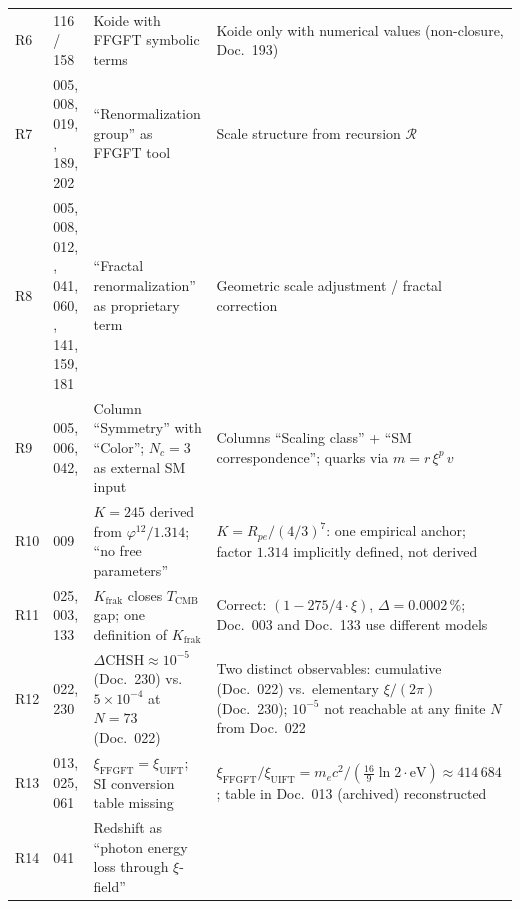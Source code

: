 {\begin{longtable}{p{0.6cm}p{2.4cm}p{5.5cm}p{5.5cm}}
R6 & 116 / 158 &
  Koide with FFGFT symbolic terms &
  Koide only with numerical values (non-closure, Doc.~193) \\[3pt]
R7 & 005, 008, 019, \newline 086, 189, 202 &
  \enquote{Renormalization group} as FFGFT tool &
  Scale structure from recursion $\mathcal{R}$ \\[3pt]
R8 & 005, 008, 012, \newline 014, 041, 060, \newline 133, 141, 159, 181 &
  \enquote{Fractal renormalization} as proprietary term &
  Geometric scale adjustment / fractal correction \\
R9 & 005, 006, 042, \newline 046 &
  Column \enquote{Symmetry} with \enquote{Color}; \newline
  $N_c = 3$ as external SM input &
  Columns \enquote{Scaling class} + \enquote{SM correspondence}; \newline
  quarks via $m = r\,\xi^p\,v$ \\[3pt]
R10 & 009 &
  $K = 245$ derived from $\varphi^{12}/1.314$; \newline
  \enquote{no free parameters} &
  $K = R_{pe}/(4/3)^7$: one empirical anchor; \newline
  factor $1.314$ implicitly defined, not derived \\[3pt]
R11 & 025, 003, 133 &
  $K_\text{frak}$ closes $T_\text{CMB}$ gap; \newline
  one definition of $K_\text{frak}$ &
  Correct: $(1-275/4\cdot\xi)$, $\Delta=0.0002\,\%$; \newline
  Doc.~003 and Doc.~133 use different models \\[3pt]
R12 & 022, 230 &
  $\Delta\text{CHSH} \approx 10^{-5}$ (Doc.~230) vs.\ \newline
  $5\times10^{-4}$ at $N=73$ (Doc.~022) &
  Two distinct observables: cumulative (Doc.~022) vs.\ elementary $\xi/(2\pi)$ (Doc.~230); \newline
  $10^{-5}$ not reachable at any finite $N$ from Doc.~022 \\[3pt]
R13 & 013, 025, 061 &
  $\xi_\text{FFGFT} = \xi_\text{UIFT}$; \newline
  SI conversion table missing &
  $\xi_\text{FFGFT}/\xi_\text{UIFT} = m_ec^2/(\frac{16}{9}\ln 2\cdot\text{eV}) \approx 414\,684$; \newline
  table in Doc.~013 (archived) reconstructed \\[3pt]
R14 & 041 &
  Redshift as \enquote{photon energy loss through $\xi$-field} &

\end{longtable}}
